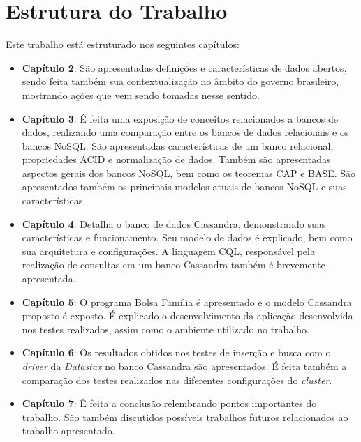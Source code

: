 \section{Estrutura do Trabalho}
Este trabalho está estruturado nos seguintes capítulos:
\begin{itemize}
\item \textbf{Capítulo 2}: São apresentadas definições e características de dados abertos, sendo feita também sua contextualização no âmbito do governo brasileiro, mostrando ações que vem sendo tomadas nesse sentido.
\item \textbf{Capítulo 3}: É feita uma exposição de conceitos relacionados a bancos de dados, realizando uma comparação entre os bancos de dados relacionais e os bancos NoSQL. São apresentadas características de um banco relacional, propriedades ACID e normalização de dados. Também são apresentadas aspectos gerais dos bancos NoSQL, bem como os teoremas CAP e BASE. São apresentados também os principais modelos atuais de bancos NoSQL e suas características.
\item \textbf{Capítulo 4}: Detalha o banco de dados Cassandra, demonstrando suas características e funcionamento. Seu modelo de dados é explicado, bem como sua arquitetura e configurações. A linguagem CQL, responsável pela realização de consultas em um banco Cassandra também é brevemente apresentada.
\item \textbf{Capítulo 5}: O programa Bolsa Família é apresentado e o modelo Cassandra proposto é exposto. É explicado o desenvolvimento da aplicação desenvolvida nos testes realizados, assim como o ambiente utilizado no trabalho.
\item \textbf{Capítulo 6}: Os resultados obtidos nos testes de inserção e busca com o \emph{driver} da \emph{Datastax} no banco Cassandra são apresentados. É feita também a comparação dos testes realizados nas diferentes configurações do \emph{cluster}.
\item \textbf{Capítulo 7}: É feita a conclusão relembrando pontos importantes do trabalho. São também discutidos possíveis trabalhos futuros relacionados ao trabalho apresentado.
\end{itemize}




